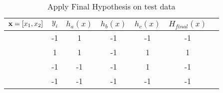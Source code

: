 \begin{table}[H]
  \centering
  \caption{Apply Final Hypothesis on test data}
  \label{tab:Ada1}
  \begin{tabular}{|c|c|c|c|c|c|c|}
    \hline
    ${\bf x} = [x_1,x_2]$ & $y_i$ & $h_a(x)$ & $h_b(x)$ & $h_c(x)$ & $H_{final}(x)$ \\ \hline
    [1,1]          &     -1  & 1    & -1   & -1                         &  -1     \\ \hline
    [1,-1]         &    1   & 1    & -1   & 1                          &    1   \\ \hline
    [-1,-1]        &     -1  & -1    & -1   & 1                           & -1      \\ \hline
    [-1,1]         &     -1 & -1    & -1   & -1                           &  -1     \\ \hline
  \end{tabular}
\end{table}
